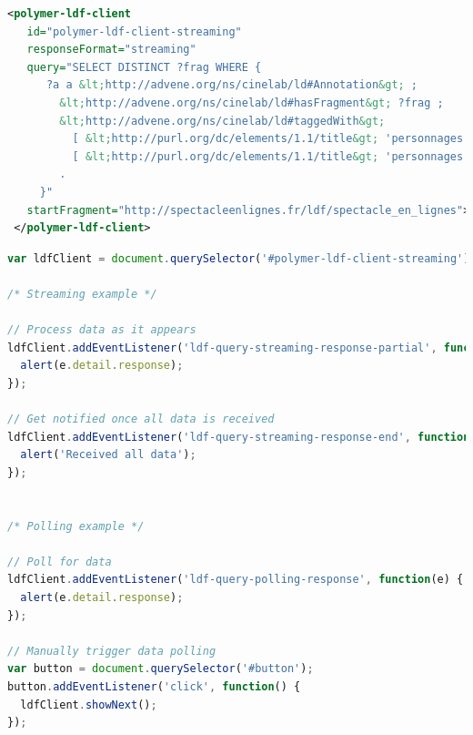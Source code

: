 \documentclass[runningheads,a4paper]{llncs}
\begin{document}
\begin{lstlisting}[caption={Linked Data Fragments Web Component \texttt{<polymer-ldf-client>}},
  label=listing:ldfclient, language=XML,
  float=b!, showstringspaces=false, stringstyle=\color{gray},morekeywords={polymer,ldf,id,client,responseFormat,query,startFragment}]
<polymer-ldf-client
   id="polymer-ldf-client-streaming"
   responseFormat="streaming"
   query="SELECT DISTINCT ?frag WHERE {
      ?a a &lt;http://advene.org/ns/cinelab/ld#Annotation&gt; ;
        &lt;http://advene.org/ns/cinelab/ld#hasFragment&gt; ?frag ;
        &lt;http://advene.org/ns/cinelab/ld#taggedWith&gt;
          [ &lt;http://purl.org/dc/elements/1.1/title&gt; 'personnages: Maggie'],
          [ &lt;http://purl.org/dc/elements/1.1/title&gt; 'personnages: Brick'];
        .
     }"
   startFragment="http://spectacleenlignes.fr/ldf/spectacle_en_lignes">
 </polymer-ldf-client>
\end{lstlisting}

\begin{lstlisting}[caption={Obtaining streaming and polling data from the Linked Data Fragments Web Component \texttt{<polymer-ldf-client>}},
  label=listing:ldfclientcode, language=JavaScript,
  float=b!, showstringspaces=false, stringstyle=\color{gray},morekeywords={document,addEventListener,alert,querySelector,querySelectorAll}]
var ldfClient = document.querySelector('#polymer-ldf-client-streaming');

/* Streaming example */

// Process data as it appears
ldfClient.addEventListener('ldf-query-streaming-response-partial', function(e) {
  alert(e.detail.response);
});

// Get notified once all data is received
ldfClient.addEventListener('ldf-query-streaming-response-end', function() {
  alert('Received all data');
});


/* Polling example */

// Poll for data
ldfClient.addEventListener('ldf-query-polling-response', function(e) {
  alert(e.detail.response);
});

// Manually trigger data polling
var button = document.querySelector('#button');
button.addEventListener('click', function() {
  ldfClient.showNext();
});
\end{lstlisting}
\end{document}
